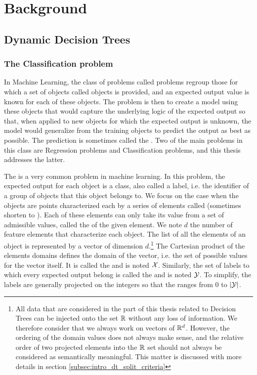 \chapter{Background}
\section{Dynamic Decision Trees}
\subsection{The Classification problem} \label{subsec:intro_classification}
In Machine Learning, the class of problems called  problems regroup those for which a set of objects called  objects is provided, and an expected output value is known for each of these objects. The problem is then to create a model using these objects that would capture the underlying logic of the expected output so that, when applied to new objects for which the expected output is unknown, the model would generalize from the training objects to predict the output as best as possible. The prediction is sometimes called the . Two of the main problems in this class are Regression problems and Classification problems, and this thesis addresses the latter.

The  is a very common problem in machine learning. In this problem, the expected output for each object is a class, also called a label, i.e. the identifier of a group of objects that this object belongs to. We focus on the case when the objects are points characterized each by a series of elements called  (sometimes shorten to ). Each of these elements can only take its value from a set of admissible values, called the  of the given element. We note $d$ the number of feature elements that characterize each object. The list of all the elements of an object is represented by a vector of dimension $d$.\footnote{All data that are considered in the part of this thesis related to Decision Trees can be injected onto the set $\mathbb{R}$ without any loss of information. We therefore consider that we always work on vectors of $\mathbb{R}^d$. However, the ordering of the domain values does not always make sense, and the relative order of two projected elements into the $\mathbb{R}$ set should not always be considered as semantically meaningful. This matter is discussed with more details in section \ref{subsec:intro_dt_split_criteria}} The Cartesian product of the elements domains defines the domain of the vector, i.e. the set of possible values for the vector itself. It is called the  and is noted $\mathcal{X}$. Similarly, the set of labels to which every expected output belong is called the  and is noted $\mathcal{Y}$. To simplify, the labels are generally projected on the integers so that the  ranges from $0$ to $|\mathcal{Y}|$.

